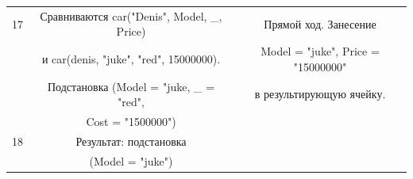 \documentclass[12pt]{report}
\begin{document}
\begin{table}[H]
\begin{center}
\begin{tabular}{|c c c |}
			\hline
			17 & Сравниваются car("Denis", Model, \_, Price) & Прямой ход. Занесение \\
			  & и car(denis, "juke", "red", 15000000). & Model = "juke"{}, Price = "15000000"{}\\
			  & Подстановка (Model = "juke, \_ = "red",  & в результирующую ячейку. \\
			  & Cost = "1500000")  & \\
			\hline
			18 & Результат: подстановка & \\
			   & (Model = "juke"{}) & \\
			\hline
		\end{tabular}
	\end{center}
\end{table}
\end{document}
